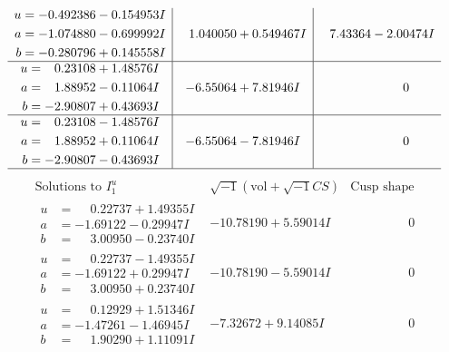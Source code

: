 \documentclass[1p]{elsarticle_modified}
\theoremstyle{definition}
\newcommand{\I}{\sqrt{-1}}
\begin{document}
$$\begin{array}{c|c|c}
\begin{aligned}
u &= -0.492386 - 0.154953 I \\
a &= -1.074880 - 0.699992 I \\
b &= -0.280796 + 0.145558 I\end{aligned}
 & \phantom{-}1.040050 + 0.549467 I & \phantom{-}7.43364 - 2.00474 I \\ \hline\begin{aligned}
u &= \phantom{-}0.23108 + 1.48576 I \\
a &= \phantom{-}1.88952 - 0.11064 I \\
b &= -2.90807 + 0.43693 I\end{aligned}
 & -6.55064 + 7.81946 I & \phantom{-0.000000 } 0 \\ \hline\begin{aligned}
u &= \phantom{-}0.23108 - 1.48576 I \\
a &= \phantom{-}1.88952 + 0.11064 I \\
b &= -2.90807 - 0.43693 I\end{aligned}
 & -6.55064 - 7.81946 I & \phantom{-0.000000 } 0\\
 \hline 
 \end{array}$$\newpage$$\begin{array}{c|c|c}  
\text{Solutions to }I^u_{1}& \I (\text{vol} + \sqrt{-1}CS) & \text{Cusp shape}\\
 \hline 
\begin{aligned}
u &= \phantom{-}0.22737 + 1.49355 I \\
a &= -1.69122 - 0.29947 I \\
b &= \phantom{-}3.00950 - 0.23740 I\end{aligned}
 & -10.78190 + 5.59014 I & \phantom{-0.000000 } 0 \\ \hline\begin{aligned}
u &= \phantom{-}0.22737 - 1.49355 I \\
a &= -1.69122 + 0.29947 I \\
b &= \phantom{-}3.00950 + 0.23740 I\end{aligned}
 & -10.78190 - 5.59014 I & \phantom{-0.000000 } 0 \\ \hline\begin{aligned}
u &= \phantom{-}0.12929 + 1.51346 I \\
a &= -1.47261 - 1.46945 I \\
b &= \phantom{-}1.90290 + 1.11091 I\end{aligned}
 & -7.32672 + 9.14085 I & \phantom{-0.000000 } 0 \\ \hline\begin{aligned}

\end{aligned}
\end{array}$$
\end{document}
